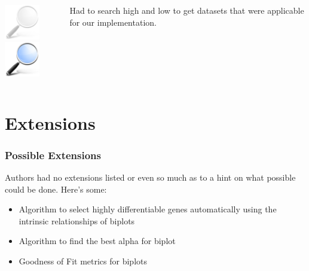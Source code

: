 \documentclass[serif]{beamer}
\begin{document}
\begin{frame}[t]
{\begin{itemize}
{\begin{columns}
\begin{column}{3.5in}
							\begin{block}{\vspace{-0.5in}}
							\begin{columns}
								\begin{column}{1.0in}
									\begin{center}
										{
											\includegraphics[width=0.60in]{images/search_dimmed}	
										}
										\only<8>
										{
											\includegraphics[width=0.60in]{images/search}
										}
									\end{center}
								\end{column}
								\begin{column}{2.5in}
									\color<6-7>{blockgray}
									{
										\footnotesize
										Had to search high and low to get datasets that were applicable for our implementation.
									}
								\end{column}	
							\end{columns}
							\end{block}
						\end{column}
					\end{columns}
				}
			\end{itemize}
		}
	\end{frame}
	
	\section{Extensions}
	
	\begin{frame}[t]
		\frametitle{Possible Extensions}
		Authors had no extensions listed or even so much as to a hint on what possible could be done.
		\newline\newline
		Here's some:
		\begin{itemize}
			\item  Algorithm to select highly differentiable genes automatically
			using the intrinsic relationships of biplots
			\item  Algorithm to find the best alpha for biplot
			\item  Goodness of Fit metrics for biplots
		\end{itemize}
	\end{frame}
	
\end{document}
